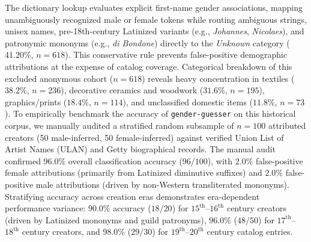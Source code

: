 \documentclass[pdflatex,sn-mathphys-num]{sn-jnl}%
\theoremstyle{thmstyleone}%
\theoremstyle{thmstyletwo}%
\theoremstyle{thmstylethree}%
\begin{document}
The dictionary lookup evaluates explicit first-name gender associations, mapping unambiguously recognized male or female tokens while routing ambiguous strings, unisex names, pre-18th-century Latinized variants (e.g., \textit{Johannes}, \textit{Nicolaes}), and patronymic mononyms (e.g., \textit{di Bondone}) directly to the \textit{Unknown} category ($41.20\%$, $n=618$). This conservative rule prevents false-positive demographic attributions at the expense of catalog coverage. Categorical breakdown of this excluded anonymous cohort ($n=618$) reveals heavy concentration in textiles ($38.2\%$, $n=236$), decorative ceramics and woodwork ($31.6\%$, $n=195$), graphics/prints ($18.4\%$, $n=114$), and unclassified domestic items ($11.8\%$, $n=73$). To empirically benchmark the accuracy of \texttt{gender-guesser} on this historical corpus, we manually audited a stratified random subsample of $n=100$ attributed creators (50 male-inferred, 50 female-inferred) against verified Union List of Artist Names (ULAN) and Getty biographical records. The manual audit confirmed $96.0\%$ overall classification accuracy ($96/100$), with $2.0\%$ false-positive female attributions (primarily from Latinized diminutive suffixes) and $2.0\%$ false-positive male attributions (driven by non-Western transliterated mononyms). Stratifying accuracy across creation eras demonstrates era-dependent performance variance: $90.0\%$ accuracy ($18/20$) for $15^{\text{th}}$--$16^{\text{th}}$ century creators (driven by Latinized mononyms and guild patronyms), $96.0\%$ ($48/50$) for $17^{\text{th}}$--$18^{\text{th}}$ century creators, and $98.0\%$ ($29/30$) for $19^{\text{th}}$--$20^{\text{th}}$ century catalog entries.
\end{document}
